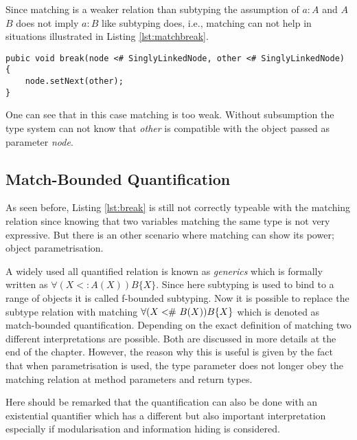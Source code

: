 Since matching is a weaker relation than subtyping the assumption of $a:A$
and $A$ \match $B$ does not imply $a:B$ like subtyping does, i.e., matching
can not help in situations illustrated in Listing \ref{lst:matchbreak}.

\begin{lstlisting}[float=ht,label={lst:matchbreak},caption={Matching relation in the break method}]
pubic void break(node <# SinglyLinkedNode, other <# SinglyLinkedNode) {
	node.setNext(other);
}
\end{lstlisting}

One can see that in this case matching is too weak. Without subsumption
the type system can not know that \emph{other} is compatible with the
object passed as parameter \emph{node}.

\subsection{Match-Bounded Quantification}
As seen before, Listing \ref{lst:break} is still not correctly typeable
with the matching relation since knowing that two variables matching
the same type is not very expressive. But there is an other scenario
where matching can show its power; object parametrisation.

A widely used all quantified relation is known as \emph{generics}
which is formally written as $\forall (X <: A(X))B\{X\}$. Since here
subtyping is used to bind \X to a range of objects it is called f-bounded
subtyping. Now it is possible to replace the subtype relation with
matching $\forall(X <\!\!\#~ B(X))B\{X\}$ which is denoted as match-bounded
quantification. Depending on the exact definition of matching two
different interpretations are possible\cite{abadi_subtyping_1996}. Both
are discussed in more details at the end of the chapter. However, the
reason why this is useful is given by the fact that when parametrisation
is used, the type parameter does not longer obey the matching relation
at method parameters and return types.

Here should be remarked that the quantification can also be done with an
existential quantifier which has a different but also important
interpretation especially if modularisation and information hiding is
considered\cite{cameron_existential_2009,pierce_types_2002}.

